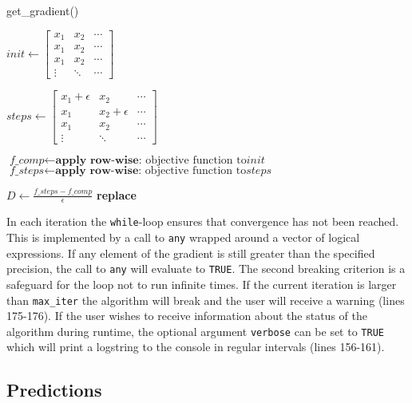 \documentclass{article}
\begin{document}
\begin{algorithm}
\caption{get\_gradient()}\label{getGrad}
\begin{algorithmic}[1]
\State $\textit{init} \gets \begin{bmatrix}
x_1 & x_2 & \cdots\\
x_1 & x_2 & \cdots\\
x_1 & x_2 & \cdots\\
\vdots & \ddots & \cdots
\end{bmatrix} $

\State $\textit{steps} \gets 
\begin{bmatrix}
x_1 + \epsilon & x_2 & \cdots\\
x_1 & x_2 + \epsilon & \cdots\\
x_1 & x_2 & \cdots\\
\vdots & \ddots & \cdots
\end{bmatrix}$

\State $\textit{f\_comp} \gets \textbf{apply row-wise:} \text{ objective function to} \textit{init}$
\State $\textit{f\_steps} \gets \textbf{apply row-wise:} \text{ objective function to} \textit{steps}$
\EndProcedure

\State $\textit{D} \gets \frac{f\_steps - f\_comp}{\epsilon}$
 \textbf{replace} 
\EndIf
\EndProcedure
\end{algorithmic}
\end{algorithm}



In each iteration the \texttt{while}-loop ensures that convergence has not been reached. This is implemented by a call to \texttt{any} wrapped around a vector of logical expressions. If any element of the gradient is still greater than the specified precision, the call to \texttt{any} will evaluate to \texttt{TRUE}. The second breaking criterion is a safeguard for the loop not to run infinite times. If the current iteration is larger than \texttt{max\_iter} the algorithm will break and the user will receive a warning (lines 175-176). If the user wishes to receive information about the status of the algorithm during runtime, the optional argument \texttt{verbose} can be set to \texttt{TRUE} which will print a logstring to the console in regular intervals (lines 156-161).

\subsection{Predictions}
\end{document}
